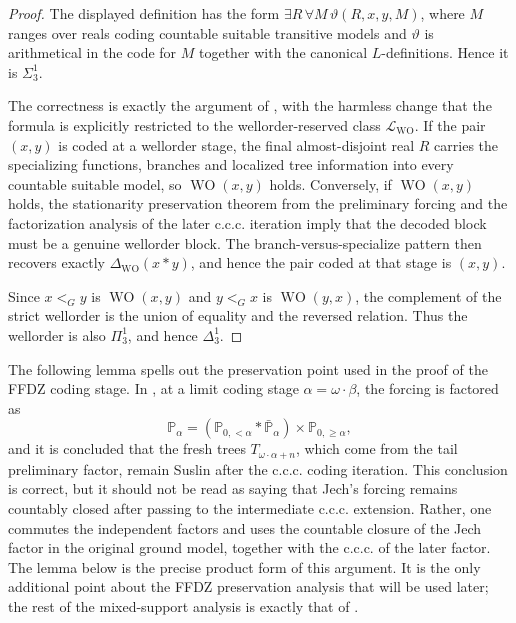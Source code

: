 \documentclass[11pt]{article}
\theoremstyle{plain}
\theoremstyle{definition}
\theoremstyle{remark}
\newcommand{\Pp}{\mathbb P}
\newcommand{\WO}{\operatorname{WO}}
\begin{document}
\begin{proof}
The displayed definition has the form $\exists R\,\forall M\,\vartheta(R,x,y,M)$,
where $M$ ranges over reals coding countable suitable transitive models and
$\vartheta$ is arithmetical in the code for $M$ together with the canonical
$L$-definitions.  Hence it is $\Sigma^1_3$.

The correctness is exactly the argument of \cite[Lemma 2.8]{FISCHER2013763},
with the harmless change that the formula is explicitly restricted to the
wellorder-reserved class $\mathcal L_{\mathrm{WO}}$.  If the pair $(x,y)$ is
coded at a wellorder stage, the final almost-disjoint real $R$ carries the
specializing functions, branches and localized tree information into every
countable suitable model, so $\WO(x,y)$ holds.  Conversely, if $\WO(x,y)$ holds,
the stationarity preservation theorem from the preliminary forcing and the
factorization analysis of the later c.c.c. iteration imply that the decoded block
must be a genuine wellorder block.  The branch-versus-specialize pattern then
recovers exactly $\Delta_{\mathrm{WO}}(x*y)$, and hence the pair coded at that
stage is $(x,y)$.

Since $x<_{G}y$ is $\WO(x,y)$ and $y<_{G}x$ is $\WO(y,x)$, the complement of the
strict wellorder is the union of equality and the reversed relation.  Thus the
wellorder is also $\Pi^1_3$, and hence $\Delta^1_3$.
\end{proof}

The following lemma spells out the preservation point used in the proof of the
FFDZ coding stage.  In \cite[Claim~2.7]{FISCHER2013763}, at a limit coding stage
\(\alpha=\omega\cdot\beta\), the forcing is factored as
\[
  \Pp_\alpha=(\Pp_{0,<\alpha}*\bar{\Pp}_\alpha)\times\Pp_{0,\geq\alpha},
\]
and it is concluded that the fresh trees \(T_{\omega\cdot\alpha+n}\), which
come from the tail preliminary factor, remain Suslin after the c.c.c. coding
iteration.  This conclusion is correct, but it should not be read as saying that
Jech's forcing remains countably closed after passing to the intermediate c.c.c.
extension.  Rather, one commutes the independent factors and uses the countable
closure of the Jech factor in the original ground model, together with the c.c.c.
of the later factor.  The lemma below is the precise product form of this
argument.  It is the only additional point about the FFDZ preservation analysis
that will be used later; the rest of the mixed-support analysis is exactly that
of \cite[Section~2, especially Propositions~2.2, 2.3, 2.6 and Claim~2.7]
{FISCHER2013763}.
\end{document}

